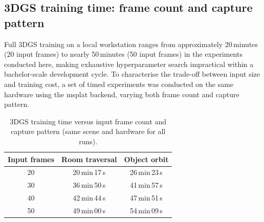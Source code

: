 \subsection{3DGS training time: frame count and capture pattern}
\label{sec:efficient_3dgs_design}

Full 3DGS training on a local workstation ranges from approximately 20\,minutes
(20 input frames) to nearly 50\,minutes (50 input frames) in the experiments
conducted here, making exhaustive hyperparameter search impractical within a
bachelor-scale development cycle. To characterise the trade-off between input
size and training cost, a set of timed experiments was conducted on the same
hardware using the msplat backend, varying both
frame count and capture pattern.

\begin{table}[htbp]
\centering
\caption{3DGS training time versus input frame count and capture pattern
         (same scene and hardware for all runs).}
\label{tab:3dgs_timing}
\begin{tabular}{ccc}
\toprule
\textbf{Input frames} & \textbf{Room traversal} & \textbf{Object orbit} \\
\midrule
20 & 20\,min\,17\,s & 26\,min\,23\,s \\
30 & 36\,min\,50\,s & 41\,min\,57\,s \\
40 & 42\,min\,44\,s & 47\,min\,51\,s \\
50 & 49\,min\,00\,s & 54\,min\,09\,s \\
\bottomrule
\end{tabular}
\end{table}

